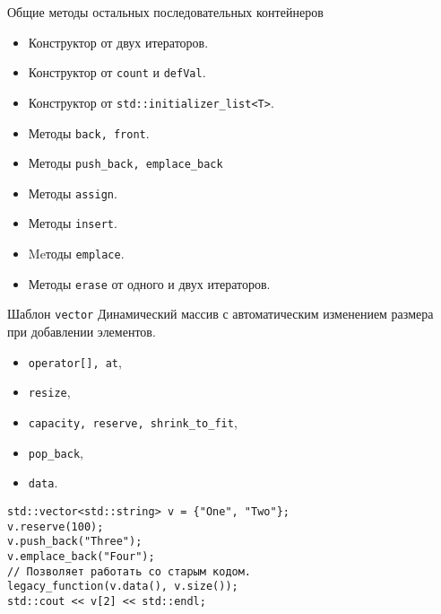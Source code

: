 \documentclass{beamer}
\begin{document}
\begin{frame}{Общие методы остальных последовательных контейнеров}
\begin{itemize}
    \item Конструктор от двух итераторов.  
    \item Конструктор от \texttt{count} и \texttt{defVal}.
    \item Конструктор от \texttt{std::initializer\_list<T>}.
    \item Методы {\tt back, front}.
    \item Методы \texttt{push\_back, emplace\_back}    
    \item Методы {\tt assign}.
    \item Методы {\tt insert}. 
    \item Meтоды \texttt{emplace}.
    \item Методы \texttt{erase} от одного и двух итераторов. 
\end{itemize}
\end{frame}

\begin{frame}[fragile]{Шаблон {\tt vector}}
    Динамический массив с автоматическим изменением размера\\ при
    добавлении элементов.

\begin{itemize}
    \item \texttt{operator[], at},
    \item \texttt{resize},
    \item \texttt{capacity, reserve, shrink\_to\_fit},
    \item \texttt{pop\_back},
    \item \texttt{data}.
\end{itemize}

\begin{lstlisting}
std::vector<std::string> v = {"One", "Two"};
v.reserve(100);
v.push_back("Three");
v.emplace_back("Four");
// Позволяет работать со старым кодом.
legacy_function(v.data(), v.size());
std::cout << v[2] << std::endl;
\end{lstlisting}
\end{frame}
           
\end{document}
